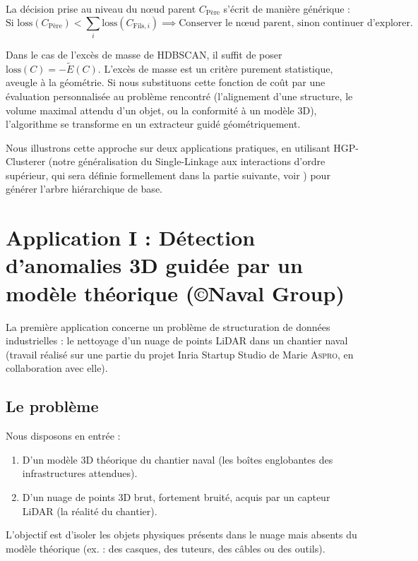 La décision prise au niveau du nœud parent $C_{\mathrm{Père}}$ s'écrit de manière générique :
\[
    \text{Si } \mathrm{loss}(C_{\mathrm{Père}}) < \sum_{i} \mathrm{loss}(C_{\mathrm{Fils}, i}) \implies \text{Conserver le nœud parent, sinon continuer d'explorer.}
\]

Dans le cas de l'excès de masse de HDBSCAN, il suffit de poser $ \mathrm{loss}(C) = - \tilde E(C)$.
L'excès de masse est un critère purement statistique, aveugle à la géométrie. Si nous substituons cette fonction de coût par une évaluation personnalisée au problème rencontré (l'alignement d'une structure, le volume maximal attendu d'un objet, ou la conformité à un modèle 3D), l'algorithme se transforme en un extracteur guidé géométriquement. 

Nous illustrons cette approche sur deux applications pratiques, en utilisant {HGP-Clusterer} (notre généralisation du Single-Linkage aux interactions d'ordre supérieur, qui sera définie formellement dans la partie suivante, voir ) pour générer l'arbre hiérarchique de base.


\section{Application I : Détection d'anomalies 3D guidée par un modèle théorique (\copyright Naval Group)}

La première application concerne un problème de structuration de données industrielles : le nettoyage d'un nuage de points LiDAR dans un chantier naval (travail réalisé sur une partie du projet Inria Startup Studio de Marie \textsc{Aspro}, en collaboration avec elle).

\subsection{Le problème}
Nous disposons en entrée :
\begin{enumerate}
    \item D'un modèle 3D théorique du chantier naval (les boîtes englobantes des infrastructures attendues).
    \item D'un nuage de points 3D brut, fortement bruité, acquis par un capteur LiDAR (la réalité du chantier).
\end{enumerate}
L'objectif est d'isoler les objets physiques présents dans le nuage mais absents du modèle théorique (ex. : des casques, des tuteurs, des câbles ou des outils). 


